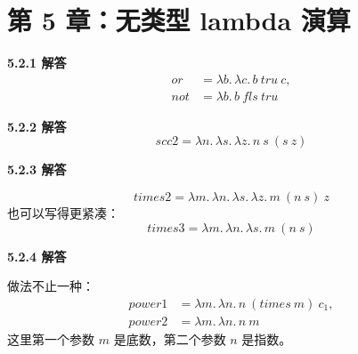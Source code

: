 \section{第 5 章：无类型 lambda 演算}

\begin{taplauthorsolutionentrybox}
\label{sol:author:5.2.1}
\textbf{5.2.1 解答}
\[
\begin{aligned}
\mathit{or}  &=\lambda b.\,\lambda c.\,b\ \mathit{tru}\ c,\\
\mathit{not} &=\lambda b.\,b\ \mathit{fls}\ \mathit{tru}
\end{aligned}
\]
\end{taplauthorsolutionentrybox}

\begin{taplauthorsolutionentrybox}
\label{sol:author:5.2.2}
\textbf{5.2.2 解答}
\[
  \mathit{scc2}
  =\lambda n.\,\lambda s.\,\lambda z.\,n\ s\ (s\ z)
\]
\end{taplauthorsolutionentrybox}

\begin{taplauthorsolutionentrybox}
\label{sol:author:5.2.3}
\textbf{5.2.3 解答}

\[
  \mathit{times2}
  =\lambda m.\,\lambda n.\,\lambda s.\,\lambda z.\,m\ (n\ s)\ z
\]
也可以写得更紧凑：
\[
  \mathit{times3}
  =\lambda m.\,\lambda n.\,\lambda s.\,m\ (n\ s)
\]
\end{taplauthorsolutionentrybox}

\begin{taplauthorsolutionentrybox}
\label{sol:author:5.2.4}
\textbf{5.2.4 解答}

做法不止一种：
\[
\begin{aligned}
\mathit{power1}
  &=\lambda m.\,\lambda n.\,n\ (\mathit{times}\ m)\ c_1,\\
\mathit{power2}
  &=\lambda m.\,\lambda n.\,n\ m
\end{aligned}
\]
这里第一个参数 \(m\) 是底数，第二个参数 \(n\) 是指数。


\end{taplauthorsolutionentrybox}

